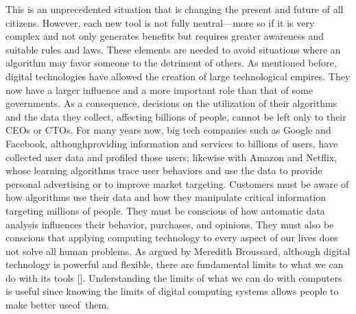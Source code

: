 This is an unprecedented situation that is changing the present and future of all citizens. However, each new tool is not fully neutral---more so if it is very complex and not only generates benefits but requires greater awareness and suitable rules and laws. These elements are needed to avoid situations where an algorithm may favor someone to the detriment of others. As mentioned before, digital technologies have allowed the creation of large technological empires. They now have a larger influence and a more important role than that of some governments. As a consequence, decisions on the utilization of their algorithms and the data they collect, affecting billions of people, cannot be left only to their CEOs or CTOs. For many years now, big tech companies\vadjust{\pagebreak} such as Google and Facebook, although\break providing information and services to billions of users, have collected user data and profiled those users; likewise with Amazon and Netflix, whose learning algorithms trace user behaviors and use the data to provide personal advertising or to improve market targeting. Customers must be aware of how algorithms use their data and how they manipulate critical information targeting millions of people. They must be conscious of how automatic data analysis influences their behavior, purchases, and opinions. They must also be conscious that applying computing technology to every aspect of our lives does not solve all human problems. As argued by Meredith Broussard, although digital technology is powerful and flexible, there are fundamental limits to what we can do with its tools [\citealt{chap:prolog:Zuboff:2019}]. Understanding the limits of what we can do with computers is useful since knowing the limits of digital computing systems allows people to make better use\break of~them.

